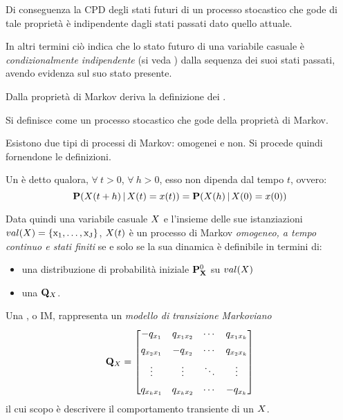 Di conseguenza la \acl{CPD} degli stati futuri di un processo stocastico che gode di tale proprietà è indipendente dagli stati passati dato quello attuale.

In altri termini ciò indica che lo stato futuro di una variabile casuale è \emph{condizionalmente indipendente} (si veda ) dalla sequenza dei suoi stati passati, avendo evidenza sul suo stato presente.

Dalla proprietà di Markov deriva la definizione dei \mprocess{}.

\begin{definizione}[\upcase\mprocess*{}]
Si definisce come \mprocess*{} un processo stocastico che gode della proprietà di Markov.
\end{definizione}

Esistono due tipi di processi di Markov: omogenei e non. Si procede quindi fornendone le definizioni.

\begin{definizione}[\upcase\mprocess*{} \omog*{}]
\label{defn:homogeneus-markov-process}
Un \mprocess*{} è detto \emph{\omog*{}} qualora, $\forall\:t>0$, $\forall\:h>0$, esso non dipenda dal tempo $t$, ovvero:
\begin{equation}
\label{eq:homogeneus-markov-process}
\mathbf{P}(\mathnormal{X}(t + h)\,\arrowvert\,\mathnormal{X}(t)=x(t))=\mathbf{P}(\mathnormal{X}(h)\,\arrowvert\,\mathnormal{X}(0)=x(0))
\end{equation}
\end{definizione}
Data quindi una variabile casuale $\mathnormal{X}$ e l'insieme delle sue istanziazioni $val(\mathnormal{X})=\{ \mathrm{x_1}, \dotsc, \mathrm{x_J} \}$, $\mathnormal{X}(t)$ è un processo di Markov \emph{omogeneo, a tempo continuo e stati finiti} se e solo se la sua dinamica è definibile in termini di:
\begin{itemize}
    \item una distribuzione di probabilità iniziale $\mathbf{P}^0_{\mathbf{X}}$ su $val(\mathnormal{X})$
    \item una \im*{} $\mathbf{Q}_{\mathnormal{X}}$.
\end{itemize}

\begin{definizione}[\upcase\im*{}]
\label{defn:im}
Una \im*{}, o \acf{IM}, rappresenta un \emph{modello di transizione Markoviano}
\[
\mathbf{Q}_{\mathnormal{X}}= \begin{bmatrix}
                        -q_{x_1}    & q_{x_1x_2}& \cdots & q_{x_1x_k}   \\[0.5em]
                        q_{x_2x_1}  & -q_{x_2}  & \cdots & q_{x_2x_k}   \\[0.5em]
                        \vdots      & \vdots    & \ddots & \vdots       \\[0.5em]
                        q_{x_kx_1}  & q_{x_kx_2}& \cdots & -q_{x_k}
                    \end{bmatrix}
\]
il cui scopo è descrivere il comportamento transiente di un \mprocess*{} \omog*{} $\mathnormal{X}$.
\end{definizione}

